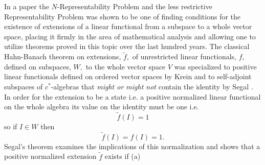 \documentclass[aps,preprint]{revtex4}%
\begin{document}
In a paper \cite{Weiner83} the $N$-Representability Problem and the less
restrictive Representability Problem was shown to be one of finding conditions
for the existence of extensions of a linear functional from a subspace to a
whole vector space, placing it firmly in the area of mathematical analysis and
allowing one to utilize theorems proved in this topic over the last hundred
years. The classical Hahn-Banach theorem \cite{Encyclo} on extensions,
$\tilde{f},$ of unrestricted linear functionals, $f$, defined on subspaces,
$W,$ to the whole vector space $V$ was specialized to positive linear
functionals defined on ordered vector spaces by Krein \cite{Krein} and to
self-adjoint subspaces of $c^{\ast}$-algebras that \emph{might or might not
}contain the identity by Segal \cite{Segal}. In order for the extension to be
a state \cite{Encyclo} i.e. a positive normalized linear functional on the
whole algebra its value on the identity must be one i.e.
\begin{equation}
\tilde{f}\left(  I\right)  =1
\end{equation}
so if $I\in W$ then
\begin{equation}
\tilde{f}\left(  I\right)  =f\left(  I\right)  =1.
\end{equation}
Segal's theorem examines the implications of this normalization and shows that
a positive normalized extension $\tilde{f}$ exists if (a)%
\end{document}
